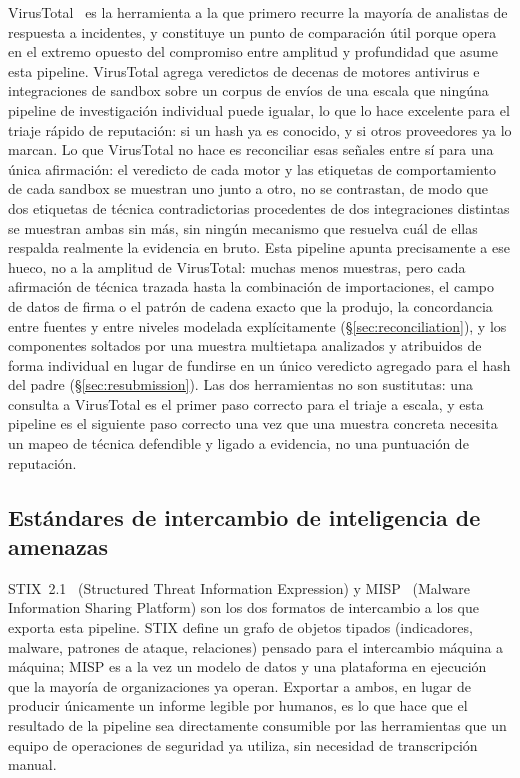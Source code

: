 VirusTotal~\cite{virustotal} es la herramienta a la que primero recurre
la mayor\'ia de analistas de respuesta a incidentes, y constituye un
punto de comparaci\'on \'util porque opera en el extremo opuesto del
compromiso entre amplitud y profundidad que asume esta pipeline.
VirusTotal agrega veredictos de decenas de motores antivirus e
integraciones de sandbox sobre un corpus de env\'ios de una escala que
ning\'una pipeline de investigaci\'on individual puede igualar, lo que lo
hace excelente para el triaje r\'apido de reputaci\'on: si un hash ya es
conocido, y si otros proveedores ya lo marcan. Lo que VirusTotal no
hace es reconciliar esas se\~nales entre s\'i para una \'unica
afirmaci\'on: el veredicto de cada motor y las etiquetas de
comportamiento de cada sandbox se muestran uno junto a otro, no se
contrastan, de modo que dos etiquetas de t\'ecnica contradictorias
procedentes de dos integraciones distintas se muestran ambas sin m\'as,
sin ning\'un mecanismo que resuelva cu\'al de ellas respalda realmente
la evidencia en bruto. Esta pipeline apunta precisamente a ese hueco,
no a la amplitud de VirusTotal: muchas menos muestras, pero cada
afirmaci\'on de t\'ecnica trazada hasta la combinaci\'on de
importaciones, el campo de datos de firma o el patr\'on de cadena
exacto que la produjo, la concordancia entre fuentes y entre niveles
modelada expl\'icitamente (\S\ref{sec:reconciliation}), y los
componentes soltados por una muestra multietapa analizados y atribuidos
de forma individual en lugar de fundirse en un \'unico veredicto
agregado para el hash del padre (\S\ref{sec:resubmission}). Las dos
herramientas no son sustitutas: una consulta a VirusTotal es el primer
paso correcto para el triaje a escala, y esta pipeline es el siguiente
paso correcto una vez que una muestra concreta necesita un mapeo de
t\'ecnica defendible y ligado a evidencia, no una puntuaci\'on de
reputaci\'on.

\subsection{Est\'andares de intercambio de inteligencia de amenazas}

STIX~2.1~\cite{stix21} (Structured Threat Information Expression) y
MISP~\cite{misp} (Malware Information Sharing Platform) son los dos
formatos de intercambio a los que exporta esta pipeline. STIX define
un grafo de objetos tipados (indicadores, malware, patrones de ataque,
relaciones) pensado para el intercambio m\'aquina a m\'aquina; MISP es a
la vez un modelo de datos y una plataforma en ejecuci\'on que la
mayor\'ia de organizaciones ya operan. Exportar a ambos, en lugar de
producir \'unicamente un informe legible por humanos, es lo que hace
que el resultado de la pipeline sea directamente consumible por las
herramientas que un equipo de operaciones de seguridad ya utiliza, sin
necesidad de transcripci\'on manual.

